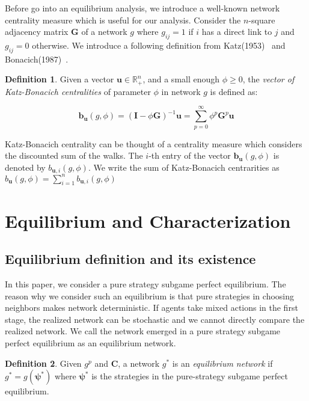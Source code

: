 \documentclass[12pt]{article}
\theoremstyle{definition}
\newtheorem{definition}{Definition}
\newcommand{\bm}[1]{\boldsymbol{#1}}
\begin{document}
Before go into an equilibrium analysis, we introduce a well-known network centrality measure which is useful for our analysis.
Consider the $n$-square adjacency matrix $\bm{G}$ of a network $g$ where $g_{ij} = 1$ if $i$ has a direct link to $j$ and $g_{ij} = 0$ otherwise.
We introduce a following definition from Katz(1953)~\cite{katz} and Bonacich(1987)~\cite{bonacich}.

\begin{definition}
Given a vector $\bm{u} \in \mathbb{R}_+^n$, and a small enough $\phi \ge 0$, the {\it{vector of Katz-Bonacich centralities}} of parameter $\phi$ in network $g$ is defined as:

\[ \bm{b}_{\bm{u}}(g, \phi) = {(\bm{I} - \phi \bm{G})}^{-1} \bm{u} = \sum_{p=0}^{\infty} \phi^p \bm{G}^p \bm{u} \]

\end{definition}

Katz-Bonacich centrality can be thought of a centrality measure which considers the discounted sum of the walks.
The $i$-th entry of the vector $\bm{b}_{\bm{u}}(g, \phi)$ is denoted by $b_{\bm{u}, i}(g, \phi)$.
We write the sum of Katz-Bonacich centrarities as $b_{\bm{u}}(g, \phi) = \sum_{i=1}^n b_{\bm{u}, i}(g, \phi)$


\section{Equilibrium and Characterization}


\subsection{Equilibrium definition and its existence}

In this paper, we consider a pure strategy subgame perfect equilibrium.
The reason why we consider such an equilibrium is that pure strategies in choosing neighbors makes network deterministic.
If agents take mixed actions in the first stage, the realized network can be stochastic and we cannot directly compare the realized network.
We call the network emerged in a pure strategy subgame perfect equilibrium as an equilibrium network.

\begin{definition}
Given $g^p$ and $\bm{C}$, a network $g^*$ is an {\it{equilibrium network}} if $g^* = g(\bm{\psi}^*)$ where $\bm{\psi}^*$ is the strategies in the pure-strategy subgame perfect equilibrium.
\end{definition}
\end{document}
